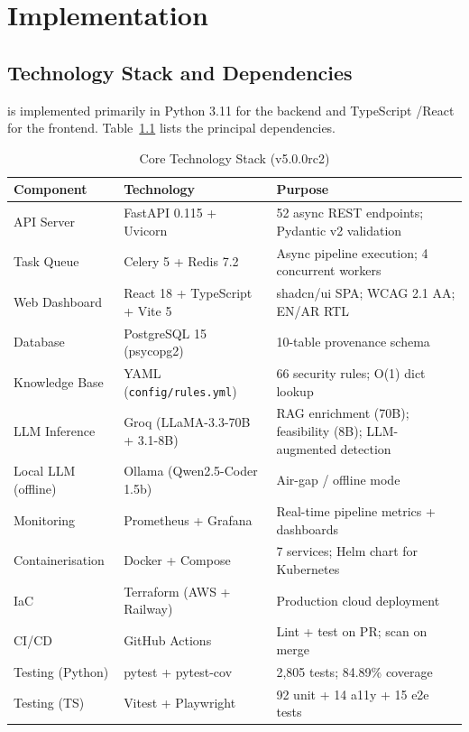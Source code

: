 \chapter{Implementation}
\label{ch:implementation}

\section{Technology Stack and Dependencies}
\label{sec:tech_stack}

\ACRQA{} is implemented primarily in Python 3.11 for the backend and TypeScript \cite{typescript_docs}/React \cite{react_docs} for the frontend. Table~\ref{tab:tech_stack} lists the principal dependencies.

\begin{table}[H]
\caption{Core Technology Stack (v5.0.0rc2)}
\label{tab:tech_stack}
\centering
\small
\renewcommand{\arraystretch}{1.15}
\begin{tabularx}{\textwidth}{@{} l l X @{}}
\toprule
\textbf{Component} & \textbf{Technology} & \textbf{Purpose} \\
\midrule
API Server          & FastAPI 0.115 + Uvicorn   & 52 async REST endpoints; Pydantic v2 validation \\
Task Queue          & Celery 5 + Redis 7.2      & Async pipeline execution; 4 concurrent workers \\
Web Dashboard       & React 18 + TypeScript + Vite 5 & shadcn/ui SPA; WCAG 2.1 AA; EN/AR RTL \\
Database            & PostgreSQL 15 (psycopg2)  & 10-table provenance schema \\
Knowledge Base      & YAML (\texttt{config/rules.yml}) & 66 security rules; O(1) dict lookup \\
LLM Inference       & Groq (LLaMA-3.3-70B + 3.1-8B) & RAG enrichment (70B); feasibility (8B); LLM-augmented detection \\
Local LLM (offline) & Ollama (Qwen2.5-Coder 1.5b) & Air-gap / offline mode \\
Monitoring          & Prometheus + Grafana      & Real-time pipeline metrics + dashboards \\
Containerisation    & Docker + Compose          & 7 services; Helm chart for Kubernetes \\
IaC                 & Terraform (AWS + Railway) & Production cloud deployment \\
CI/CD               & GitHub Actions            & Lint + test on PR; scan on merge \\
Testing (Python)    & pytest + pytest-cov       & 2,805 tests; 84.89\% coverage \\
Testing (TS)        & Vitest + Playwright       & 92 unit + 14 a11y + 15 e2e tests \\
\bottomrule
\end{tabularx}
\end{table}

